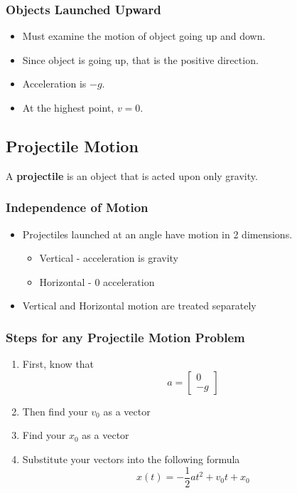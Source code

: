 \documentclass[../Notes.tex]{subfiles}
\begin{document}
\subsubsection{Objects Launched Upward}
\begin{itemize}
	\item Must examine the motion of object going up and down.
	\item Since object is going up, that is the positive direction.
	\item Acceleration is $-g$.
	\item At the highest point, $v = 0$.
\end{itemize}

\newpage
\subsection{Projectile Motion}
A \textbf{projectile} is an object that is acted upon only gravity.

\subsubsection{Independence of Motion}
\begin{itemize}
	\item Projectiles launched at an angle have motion in 2 dimensions.
	\begin{itemize}
		\item Vertical - acceleration is gravity
		\item Horizontal - 0 acceleration
	\end{itemize}
	\item Vertical and Horizontal motion are treated separately
\end{itemize}

\begin{center}
\end{center}

\subsubsection{Steps for any Projectile Motion Problem}
\begin{enumerate}
	\item First, know that 
	\begin{equation*}
	a = 
	\begin{bmatrix}
	0 \\ -g
	\end{bmatrix}
	\end{equation*}
	\item Then find your $v_0$ as a vector 
	\item Find your $x_0$ as a vector
	\item Substitute your vectors into the following formula
	\begin{equation*}
		x(t) = -\frac12 at^2 + v_0 t + x_0
	\end{equation*}
\end{enumerate}
\end{document}
